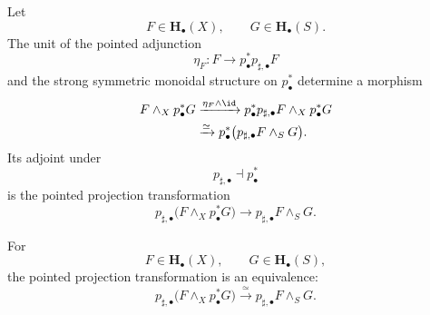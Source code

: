 \begin{construction}
\label{con:pointed-unstable-smooth-projection-transformation}
Let
\[
    F
    \in
    \mathbf H_\bullet(X),
    \qquad
    G
    \in
    \mathbf H_\bullet(S).
\]
The unit of the pointed adjunction
\[
    \eta_F
    \colon
    F
    \longrightarrow
    p^*_\bullet p_{\sharp,\bullet}F
\]
and the strong symmetric monoidal structure on \(p^*_\bullet\)
determine a morphism
\[
\begin{aligned}
    F\wedge_Xp^*_\bullet G
    &\xrightarrow{\eta_F\wedge\id}
    p^*_\bullet p_{\sharp,\bullet}F
    \wedge_X
    p^*_\bullet G
    \\
    &\xrightarrow{\simeq}
    p^*_\bullet
    \bigl(
        p_{\sharp,\bullet}F
        \wedge_S
        G
    \bigr).
\end{aligned}
\]
Its adjoint under
\[
    p_{\sharp,\bullet}
    \dashv
    p^*_\bullet
\]
is the pointed projection transformation
\[
    p_{\sharp,\bullet}
    \bigl(
        F\wedge_Xp^*_\bullet G
    \bigr)
    \longrightarrow
    p_{\sharp,\bullet}F
    \wedge_S
    G.
\]
\end{construction}

\begin{theorem}
\label{thm:pointed-unstable-smooth-projection-formula}
For
\[
    F\in\mathbf H_\bullet(X),
    \qquad
    G\in\mathbf H_\bullet(S),
\]
the pointed projection transformation is an equivalence:
\[
    p_{\sharp,\bullet}
    \bigl(
        F\wedge_Xp^*_\bullet G
    \bigr)
    \xrightarrow{\simeq}
    p_{\sharp,\bullet}F
    \wedge_S
    G.
\]
\end{theorem}


